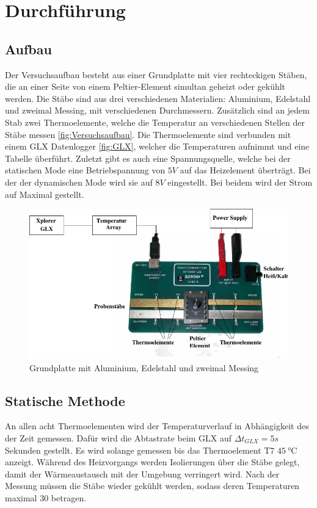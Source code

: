 \section{Durchführung}
\label{sec:Durchführung}


\subsection{Aufbau}
Der Versuchsaufbau besteht aus einer Grundplatte mit vier rechteckigen Stäben, die an einer Seite von einem Peltier-Element simultan geheizt oder gekühlt werden.
Die Stäbe sind aus drei verschiedenen Materialien:  Aluminium, Edelstahl und zweimal Messing, mit verschiedenen Durchmessern.
Zusätzlich sind an jedem Stab zwei Thermoelemente, welche die Temperatur an verschiedenen Stellen der Stäbe messen \autoref{fig:Versuchsaufbau}.
Die Thermoelemente sind verbunden mit einem GLX Datenlogger \autoref{fig:GLX}, welcher die Temperaturen aufnimmt und eine Tabelle überführt.
Zuletzt gibt es auch eine Spannungsquelle, welche bei der statischen Mode eine Betriebspannung von $5\si{V}$ auf das Heizelement überträgt. 
Bei der der dynamischen Mode wird sie auf $8\si{V}$ eingestellt. Bei beidem wird der Strom auf Maximal gestellt.

\begin{figure}[H]
    \centering
    \includegraphics{content/Abb_1.pdf}
    \caption{Grundplatte mit Aluminium, Edelstahl und zweimal Messing\cite[3]{V204}}
    \label{fig:Versuchsaufbau}
\end{figure}

\subsection{Statische Methode}
\label{subsec:durch_stat}
An allen acht Thermoelementen wird der Temperaturverlauf in Abhängigkeit des der Zeit gemessen.
Dafür wird die Abtastrate beim GLX auf $\Delta t_{GLX} = 5\si{s}$ Sekunden gestellt.
Es wird solange gemessen bis das Thermoelement T7 $\qty{45}{\degreeCelsius}$ anzeigt.
Während des Heizvorgangs werden Isolierungen über die Stäbe gelegt, damit der Wärmeaustausch mit der Umgebung verringert wird.
Nach der Messung müssen die Stäbe wieder gekühlt werden, sodass deren Temperaturen maximal $30$ betragen.

